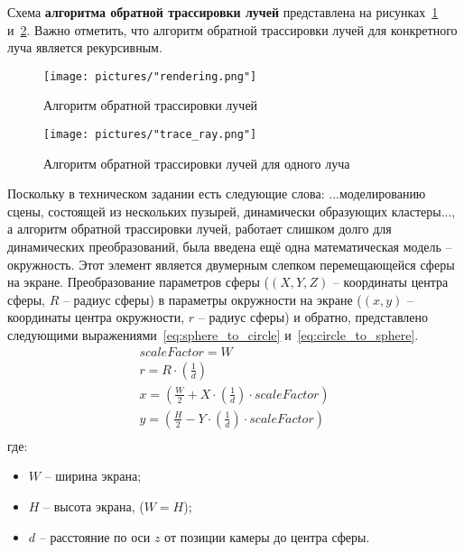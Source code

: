 \clearpage
Схема \textbf{алгоритма обратной трассировки лучей} представлена на рисунках~\ref{fig:rendering} и~\ref{fig:trace_ray}. Важно отметить, что алгоритм обратной трассировки лучей для конкретного луча является рекурсивным.
\begin{figure}[h]
	\centering
	\texttt{[image: pictures/"rendering.png"]}
	\caption{Алгоритм обратной трассировки лучей}
	\label{fig:rendering}
\end{figure}
\begin{figure}[h]
	\centering
	\texttt{[image: pictures/"trace\_ray.png"]}
	\caption{Алгоритм обратной трассировки лучей для одного луча}
	\label{fig:trace_ray}
\end{figure}
\clearpage
Поскольку в техническом задании есть следующие слова: \guillemotleft...моделированию сцены, состоящей из нескольких пузырей, динамически образующих кластеры...\guillemotright, а алгоритм обратной трассировки лучей, работает слишком долго для динамических преобразований, была введена ещё одна математическая модель -- окружность. Этот элемент является двумерным слепком перемещающейся сферы на экране.  Преобразование параметров сферы ($(X, Y, Z)$ -- координаты центра сферы, $R$ -- радиус сферы) в параметры окружности на экране ($(x, y)$ -- координаты центра окружности, $r$ -- радиус сферы) и обратно, представлено следующими выражениями~\ref{eq:sphere_to_circle} и~\ref{eq:circle_to_sphere}.
\begin{equation} \label{eq:sphere_to_circle}
\begin{gathered}
	scaleFactor = W \\
	r = R \cdot \left( \frac{1}{d} \right) \\
	x = \left( \frac{W}{2} + X \cdot \left( \frac{1}{d} \right) \cdot scaleFactor \right) \\
	y = \left( \frac{H}{2} - Y \cdot \left( \frac{1}{d} \right) \cdot scaleFactor \right) \\
\end{gathered}
\end{equation}
где: 
\begin{itemize}	
	\item $W$ -- ширина экрана;
	\item $H$ -- высота экрана, ($W = H$);
	\item $d$ -- расстояние по оси $z$ от позиции камеры до центра сферы.
\end{itemize}


